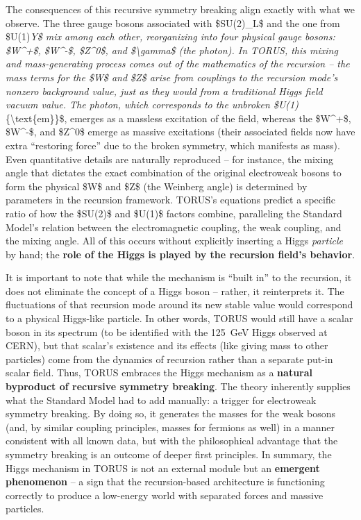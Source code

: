 The consequences of this recursive symmetry breaking align exactly with
what we observe. The three gauge bosons associated with \$SU(2)\_L\$ and
the one from \$U(1)\emph{Y\$ mix among each other, reorganizing into
four physical gauge bosons: \$W\^{}+\$, \$W\^{}-\$, \$Z\^{}0\$, and
\$\textbackslash{}gamma\$ (the photon)​. In TORUS, this mixing and
mass-generating process comes out of the mathematics of the recursion --
the mass terms for the \$W\$ and \$Z\$ arise from couplings to the
recursion mode's nonzero background value, just as they would from a
traditional Higgs field vacuum value. The photon, which corresponds to
the unbroken \$U(1)}\{\textbackslash{}text\{em\}\}\$, emerges as a
massless excitation of the field, whereas the \$W\^{}+\$, \$W\^{}-\$,
and \$Z\^{}0\$ emerge as massive excitations (their associated fields
now have extra ``restoring force'' due to the broken symmetry, which
manifests as mass)​. Even quantitative details are naturally reproduced
-- for instance, the mixing angle that dictates the exact combination of
the original electroweak bosons to form the physical \$W\$ and \$Z\$
(the Weinberg angle) is determined by parameters in the recursion
framework​. TORUS's equations predict a specific ratio of how the
\$SU(2)\$ and \$U(1)\$ factors combine, paralleling the Standard Model's
relation between the electromagnetic coupling, the weak coupling, and
the mixing angle​. All of this occurs without explicitly inserting a
Higgs \emph{particle} by hand; the \textbf{role of the Higgs is played
by the recursion field's behavior}.

It is important to note that while the mechanism is ``built in'' to the
recursion, it does not eliminate the concept of a Higgs boson -- rather,
it reinterprets it. The fluctuations of that recursion mode around its
new stable value would correspond to a physical Higgs-like particle. In
other words, TORUS would still have a scalar boson in its spectrum (to
be identified with the 125~GeV Higgs observed at CERN), but that
scalar's existence and its effects (like giving mass to other particles)
come from the dynamics of recursion rather than a separate put-in scalar
field. Thus, TORUS embraces the Higgs mechanism as a \textbf{natural
byproduct of recursive symmetry breaking}​. The theory inherently
supplies what the Standard Model had to add manually: a trigger for
electroweak symmetry breaking. By doing so, it generates the masses for
the weak bosons (and, by similar coupling principles, masses for
fermions as well) in a manner consistent with all known data, but with
the philosophical advantage that the symmetry breaking is an outcome of
deeper first principles. In summary, the Higgs mechanism in TORUS is not
an external module but an \textbf{emergent phenomenon} -- a sign that
the recursion-based architecture is functioning correctly to produce a
low-energy world with separated forces and massive particles.

